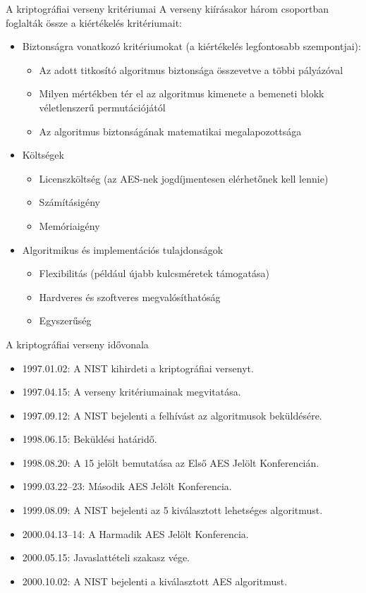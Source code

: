 \documentclass[12 pt]{beamer}
\begin{document}
\begin{frame}{A kriptográfiai verseny kritériumai}
  A verseny kiírásakor három csoportban foglalták össze a kiértékelés kritériumait:
  \begin{itemize}
    \item{Biztonságra vonatkozó kritériumokat (a kiértékelés legfontosabb szempontjai):}
      \begin{itemize}
        \item{Az adott titkosító algoritmus biztonsága összevetve a többi pályázóval}
        \item{Milyen mértékben tér el az algoritmus kimenete a bemeneti blokk véletlenszerű permutációjától}
        \item{Az algoritmus biztonságának matematikai megalapozottsága}
      \end{itemize}
    \item{Költségek}
      \begin{itemize}
        \item{Licenszköltség (az AES-nek jogdíjmentesen elérhetőnek kell lennie)}
        \item{Számításigény}
        \item{Memóriaigény}
      \end{itemize}
    \item{Algoritmikus és implementációs tulajdonságok}
      \begin{itemize}
        \item{Flexibilitás (például újabb kulcsméretek támogatása)}
        \item{Hardveres és szoftveres megvalósíthatóság}
        \item{Egyszerűség}
      \end{itemize}
  \end{itemize}
\end{frame}


\begin{frame}{A kriptográfiai verseny idővonala}
  \begin{itemize}
    \item{1997.01.02: A NIST kihirdeti a kriptográfiai versenyt.}
    \item{1997.04.15: A verseny kritériumainak megvitatása.}
    \item{1997.09.12: A NIST bejelenti a felhívást az algoritmusok beküldésére.}
    \item{1998.06.15: Beküldési határidő.}
    \item{1998.08.20: A 15 jelölt bemutatása az Első AES Jelölt Konferencián.}
    \item{1999.03.22–23: Második AES Jelölt Konferencia.}
    \item{1999.08.09: A NIST bejelenti az 5 kiválasztott lehetséges algoritmust.}
    \item{2000.04.13–14: A Harmadik AES Jelölt Konferencia.}
    \item{2000.05.15: Javaslattételi szakasz vége.}
    \item{2000.10.02: A NIST bejelenti a kiválasztott AES algoritmust.}
  \end{itemize}
\end{frame}
\end{document}
